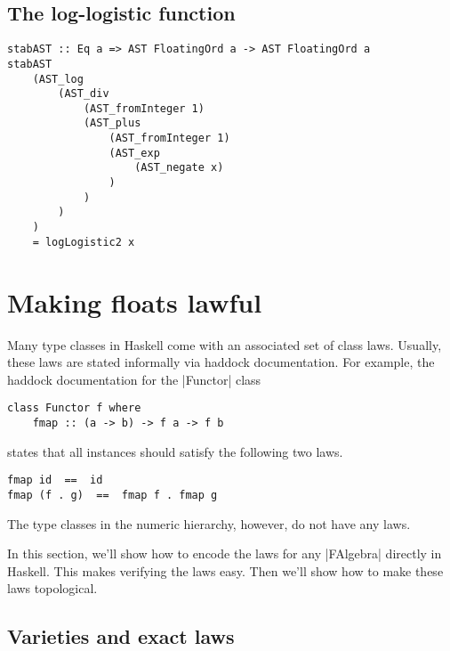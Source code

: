 \documentclass[preprint]{sigplanconf}
\theoremstyle{definition}
\begin{document}
\subsection{The log-logistic function}

\begin{lstlisting}
stabAST :: Eq a => AST FloatingOrd a -> AST FloatingOrd a
stabAST
    (AST_log
        (AST_div
            (AST_fromInteger 1)
            (AST_plus
                (AST_fromInteger 1)
                (AST_exp
                    (AST_negate x)
                )
            )
        )
    )
    = logLogistic2 x
\end{lstlisting}

\section{Making floats lawful}

Many type classes in Haskell come with an associated set of class laws.
Usually, these laws are stated informally via haddock documentation.
For example, the haddock documentation for the |Functor| class
\begin{lstlisting}
class Functor f where
    fmap :: (a -> b) -> f a -> f b
\end{lstlisting}
states that all instances should satisfy the following two laws.
\begin{lstlisting}
fmap id  ==  id
fmap (f . g)  ==  fmap f . fmap g
\end{lstlisting}
The type classes in the numeric hierarchy, however, do not have any laws.

In this section, we'll show how to encode the laws for any |FAlgebra| directly in Haskell.
This makes verifying the laws easy.
Then we'll show how to make these laws topological.

\subsection{Varieties and exact laws}
\end{document}
